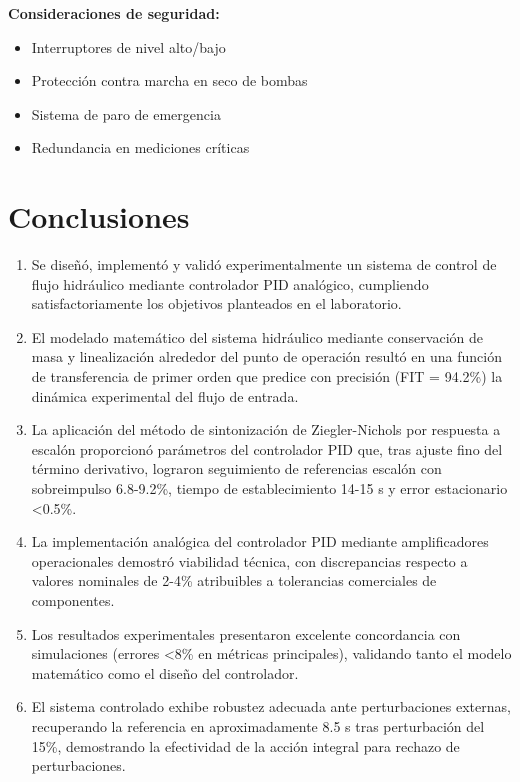 \documentclass[conference]{IEEEtran}
\begin{document}
\textbf{Consideraciones de seguridad:}
\begin{itemize}
\item Interruptores de nivel alto/bajo
\item Protección contra marcha en seco de bombas
\item Sistema de paro de emergencia
\item Redundancia en mediciones críticas
\end{itemize}

\section{Conclusiones}

\begin{enumerate}
\item Se diseñó, implementó y validó experimentalmente un sistema de control de flujo hidráulico mediante controlador PID analógico, cumpliendo satisfactoriamente los objetivos planteados en el laboratorio.

\item El modelado matemático del sistema hidráulico mediante conservación de masa y linealización alrededor del punto de operación resultó en una función de transferencia de primer orden que predice con precisión (FIT = 94.2\%) la dinámica experimental del flujo de entrada.

\item La aplicación del método de sintonización de Ziegler-Nichols por respuesta a escalón proporcionó parámetros del controlador PID que, tras ajuste fino del término derivativo, lograron seguimiento de referencias escalón con sobreimpulso 6.8-9.2\%, tiempo de establecimiento 14-15 s y error estacionario <0.5\%.

\item La implementación analógica del controlador PID mediante amplificadores operacionales demostró viabilidad técnica, con discrepancias respecto a valores nominales de 2-4\% atribuibles a tolerancias comerciales de componentes.

\item Los resultados experimentales presentaron excelente concordancia con simulaciones (errores <8\% en métricas principales), validando tanto el modelo matemático como el diseño del controlador.

\item El sistema controlado exhibe robustez adecuada ante perturbaciones externas, recuperando la referencia en aproximadamente 8.5 s tras perturbación del 15\%, demostrando la efectividad de la acción integral para rechazo de perturbaciones.


\end{enumerate}
\end{document}
